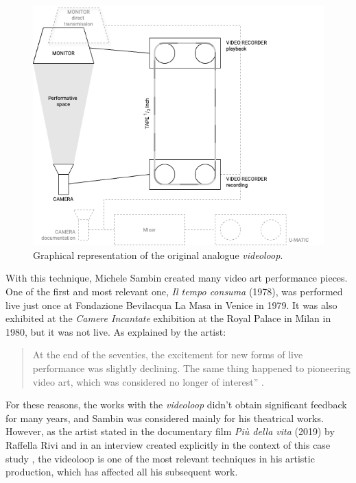 \begin{figure}[!h]
    \centering
    \includegraphics[width=\linewidth]{chapters/appendix/a/image/grapha-videoloop01.png}
    \caption{Graphical representation of the original analogue \textit{videoloop}.}
    \label{fig:aa-videoloop-graph01}
\end{figure}
With this technique, Michele Sambin created many video art performance pieces. One of the first and most relevant one, \textit{Il tempo consuma} (1978), was performed live just once at Fondazione Bevilacqua La Masa in Venice in 1979. It was also exhibited at the \textit{Camere Incantate} exhibition at the Royal Palace in Milan in 1980, but it was not live. As explained by the artist:\\ 
\begin{quote}
    At the end of the seventies, the excitement for new forms of live performance was slightly declining. The same thing happened to pioneering video art, which was considered no longer of interest” \cite{fiordelmondo2023toward}.
\end{quote}
For these reasons, the works with the \textit{videoloop} didn’t obtain significant feedback for many years, and Sambin was considered mainly for his theatrical works. However, as the artist stated in the documentary film \textit{Più della vita} (2019) by Raffella Rivi and in an interview created explicitly in the context of this case study \cite{fiordelmondo2023toward},  the videoloop is one of the most relevant techniques in his artistic production, which has affected all his subsequent work.

